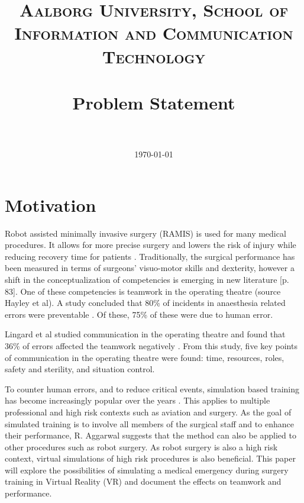 \documentclass[paper=a4, fontsize=11pt]{scrartcl} %
\title{	
\normalfont \normalsize 
\textsc{Aalborg University, School of Information and Communication Technology} \\ [25pt] %
\horrule{0.5pt} \\[0.4cm] %
\huge Problem Statement \\ %
\horrule{2pt} \\[0.5cm] %
}
\date{\normalsize\today} %
\numberwithin{equation}{section} %
\numberwithin{figure}{section} %
\numberwithin{table}{section} %
\begin{document}
\maketitle %


\section{Motivation}

Robot assisted minimally invasive surgery (RAMIS) is used for many medical procedures. It allows for more precise surgery and lowers the risk of injury while reducing recovery time for patients \citep{radojcic_[history_2009}. Traditionally, the surgical performance has been measured in terms of surgeons' visuo-motor skills and dexterity, however a shift in the conceptualization of competencies is emerging in new literature \citep{flin_safer_2009}[p. 83]. One of these competencies is teamwork in the operating theatre (source Hayley et al). A study concluded that 80\% of incidents in anaesthesia related errors were preventable \citep{chopra_reported_1992}. Of these, 75\% of these were due to human error. 

Lingard et al studied communication in the operating theatre and found that 36\% of errors affected the teamwork negatively \citep{lingard_communication_2004}. From this study, five key points of communication in the operating theatre were found: time, resources, roles, safety and sterility, and situation control.


To counter human errors, and to reduce critical events, simulation based training has become increasingly popular over the years \citep{aggarwal_simulated_2004}. This applies to multiple professional and high risk contexts such as aviation and surgery. As the goal of simulated training is to involve all members of the surgical staff and to enhance their performance, R. Aggarwal suggests that the method can also be applied to other procedures such as robot surgery. As robot surgery is also a high risk context, virtual simulations of high risk procedures is also beneficial. 
This paper will explore the possibilities of simulating a medical emergency during surgery training in Virtual Reality (VR) and document the effects on teamwork and performance. 


\end{document}
